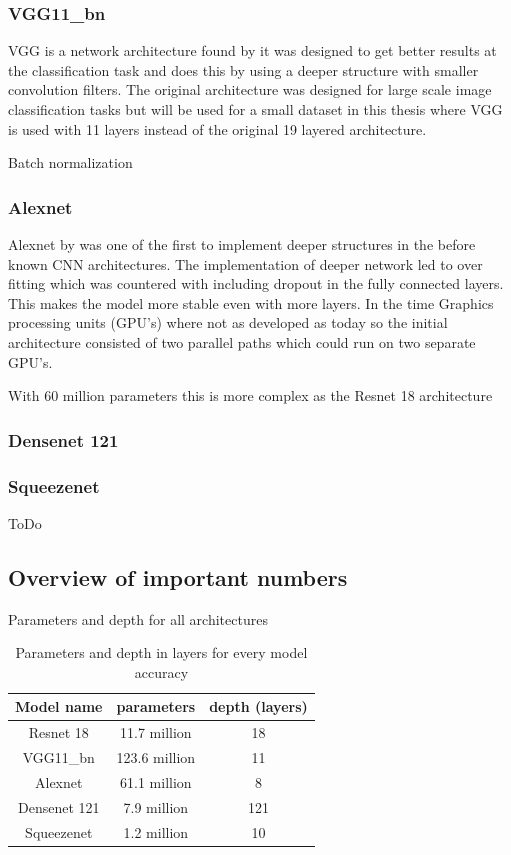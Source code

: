 		
		\subsubsection{VGG11\_bn}
		VGG is a network architecture found by \cite{Simonyan2015} it was designed to get better results at the classification task and does this by using a deeper structure with smaller convolution filters. The original architecture was designed for large scale image classification tasks but will be used for a small dataset in this thesis where VGG is used with 11 layers instead of the original 19 layered architecture.
		
		Batch normalization
		
		\subsubsection{Alexnet}
		Alexnet by \cite{Krizhevsky2017} was one of the first to implement deeper structures in the before known CNN architectures. The implementation of deeper network led to over fitting which was countered with including dropout in the fully connected layers. This makes the model more stable even with more layers. In the time Graphics processing units (GPU's) where not as developed as today so the initial architecture consisted of two parallel paths which could run on two separate GPU's. 
		
		
		
		With 60 million parameters this is more complex as the Resnet 18 architecture 
		
		\subsubsection{Densenet 121}
		
		
		\subsubsection{Squeezenet}
		ToDo

	\subsection{Overview of important numbers}
Parameters and depth for all architectures
	\begin{table}[h!]
\centering
\begin{tabular}{c | c c}
			Model name		& parameters 		& depth (layers) \\ \hline
			Resnet 18			&	11.7 million			&	18 				\\
			VGG11\_bn			&	123.6 million			& 11					\\
			Alexnet				&	61.1 million			& 8					\\
			Densenet 121	&	7.9 million			& 121				\\
			Squeezenet		&	1.2 million			& 10
\end{tabular}
\centering
\caption{Parameters and depth in layers for every model accuracy}
\label{tab:lit:ov:paramdepth}
\end{table}


